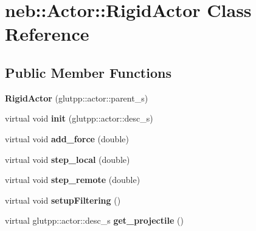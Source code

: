 \hypertarget{classneb_1_1Actor_1_1RigidActor}{
\section{neb::Actor::RigidActor Class Reference}
\label{classneb_1_1Actor_1_1RigidActor}
}
\subsection*{Public Member Functions}
\begin{DoxyCompactItemize}
\item 
\hypertarget{classneb_1_1Actor_1_1RigidActor_aa253e1971cdd1f4b3ddef3fe1fe7f863}{
{\bfseries RigidActor} (glutpp::actor::parent\_\-s)}
\label{classneb_1_1Actor_1_1RigidActor_aa253e1971cdd1f4b3ddef3fe1fe7f863}

\item 
\hypertarget{classneb_1_1Actor_1_1RigidActor_a967e256371080add564411b51b94f297}{
virtual void {\bfseries init} (glutpp::actor::desc\_\-s)}
\label{classneb_1_1Actor_1_1RigidActor_a967e256371080add564411b51b94f297}

\item 
\hypertarget{classneb_1_1Actor_1_1RigidActor_aa46996a108d191eaa0c05beabe8ba015}{
virtual void {\bfseries add\_\-force} (double)}
\label{classneb_1_1Actor_1_1RigidActor_aa46996a108d191eaa0c05beabe8ba015}

\item 
\hypertarget{classneb_1_1Actor_1_1RigidActor_a329821fb69766e1c33834885e6634555}{
virtual void {\bfseries step\_\-local} (double)}
\label{classneb_1_1Actor_1_1RigidActor_a329821fb69766e1c33834885e6634555}

\item 
\hypertarget{classneb_1_1Actor_1_1RigidActor_a072ffe441731d0709f14a3785371e860}{
virtual void {\bfseries step\_\-remote} (double)}
\label{classneb_1_1Actor_1_1RigidActor_a072ffe441731d0709f14a3785371e860}

\item 
\hypertarget{classneb_1_1Actor_1_1RigidActor_a6007e808c5437eafdf7fe8a76878c0cb}{
virtual void {\bfseries setupFiltering} ()}
\label{classneb_1_1Actor_1_1RigidActor_a6007e808c5437eafdf7fe8a76878c0cb}

\item 
\hypertarget{classneb_1_1Actor_1_1RigidActor_ab548e314daab07a821783a84cd072992}{
virtual glutpp::actor::desc\_\-s {\bfseries get\_\-projectile} ()}
\label{classneb_1_1Actor_1_1RigidActor_ab548e314daab07a821783a84cd072992}


\end{DoxyCompactItemize}
